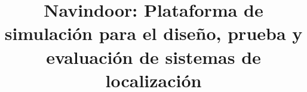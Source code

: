 \title{Navindoor: Plataforma de simulación para el diseño, prueba y evaluación de sistemas de localización}
